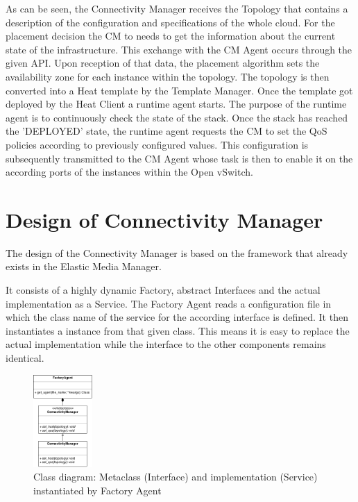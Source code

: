 As can be seen, the Connectivity Manager receives the Topology that contains a description of the configuration and specifications of the whole cloud. For the placement decision the CM to needs to get the information about the current state of the infrastructure. This exchange with the CM Agent occurs through the given API. Upon reception of that data, the placement algorithm sets the availability zone for each instance within the topology. The topology is then converted into a Heat template by the Template Manager. Once the template got deployed by the Heat Client a runtime agent starts. The purpose of the runtime agent is to continuously check the state of the stack. Once the stack has reached the 'DEPLOYED' state, the runtime agent requests the CM to set the QoS policies according to previously configured values. This configuration is subsequently transmitted to the CM Agent whose task is then to enable it on the according ports of the instances within the Open vSwitch.


\section{Design of Connectivity Manager}

The design of the Connectivity Manager is based on the framework that already exists in the Elastic Media Manager.

It consists of a highly dynamic Factory, abstract Interfaces and the actual implementation as a Service.
The Factory Agent reads a configuration file in which the class name of the service for the according interface is defined. It then instantiates a instance from that given class. This means it is easy to replace the actual implementation while the interface to the other components remains identical.

\begin{figure}[H]
\centering

\includegraphics[width=0.2\textwidth]{images/design/cm-emm_interface_classes}

\caption{Class diagram: Metaclass (Interface) and implementation (Service) instantiated by Factory Agent}
\end{figure}

